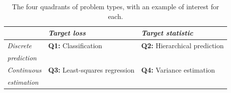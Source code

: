 \documentclass[anon,12pt]{colt2021} %
\begin{document}

\begin{table}
	\begin{center}
	\begin{tabular}{p{12ex}|l|l|} 
		& \emph{Target loss}  & \emph{Target statistic}\\ \hline
		\emph{Discrete} & \textbf{Q1:} Classification  & \textbf{Q2:} Hierarchical prediction\\ 
		{\em prediction} & & \\ \hline 
		\emph{Continuous } & \textbf{Q3:} Least-squares regression & \textbf{Q4:} Variance estimation\\ 
		\emph{estimation}& & \\
		\hline
	\end{tabular}
\caption{The four quadrants of problem types, with an example of interest for each.}
\label{tab:quadrants}
\end{center}
\end{table}
\end{document}
